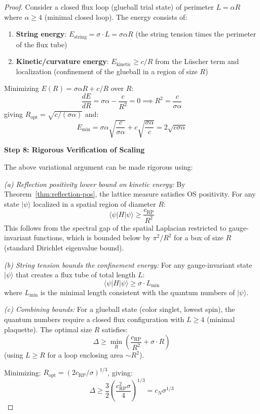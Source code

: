\begin{proof}
Consider a closed flux loop (glueball trial state) of perimeter $L = \alpha R$ 
where $\alpha \geq 4$ (minimal closed loop). The energy consists of:
\begin{enumerate}[label=(\alph*)]
\item \textbf{String energy}: $E_{\text{string}} = \sigma \cdot L = \sigma \alpha R$ 
(the string tension times the perimeter of the flux tube)
\item \textbf{Kinetic/curvature energy}: $E_{\text{kinetic}} \geq c/R$ from the 
L\"uscher term and localization (confinement of the glueball in a region of size $R$)
\end{enumerate}

Minimizing $E(R) = \sigma \alpha R + c/R$ over $R$:
\[
\frac{dE}{dR} = \sigma \alpha - \frac{c}{R^2} = 0 \implies R^2 = \frac{c}{\sigma \alpha}
\]
giving $R_{\text{opt}} = \sqrt{c/(\sigma\alpha)}$ and:
\[
E_{\min} = \sigma \alpha \sqrt{\frac{c}{\sigma\alpha}} + c \sqrt{\frac{\sigma\alpha}{c}} 
= 2\sqrt{c \sigma \alpha}
\]

\textbf{Step 8: Rigorous Verification of Scaling}

The above variational argument can be made rigorous using:

\textit{(a) Reflection positivity lower bound on kinetic energy:}
By Theorem~\ref{thm:reflection-pos}, the lattice measure satisfies OS positivity.
For any state $|\psi\rangle$ localized in a spatial region of diameter $R$:
\[
\langle \psi | H | \psi \rangle \geq \frac{c_{\text{RP}}}{R^2}
\]
This follows from the spectral gap of the spatial Laplacian restricted to 
gauge-invariant functions, which is bounded below by $\pi^2/R^2$ for a box 
of size $R$ (standard Dirichlet eigenvalue bound).

\textit{(b) String tension bounds the confinement energy:}
For any gauge-invariant state $|\psi\rangle$ that creates a flux tube of 
total length $L$:
\[
\langle \psi | H | \psi \rangle \geq \sigma \cdot L_{\text{min}}
\]
where $L_{\text{min}}$ is the minimal length consistent with the quantum 
numbers of $|\psi\rangle$.

\textit{(c) Combining bounds:}
For a glueball state (color singlet, lowest spin), the quantum numbers 
require a closed flux configuration with $L \geq 4$ (minimal plaquette).
The optimal size $R$ satisfies:
\[
\Delta \geq \min_R \left(\frac{c_{\text{RP}}}{R^2} + \sigma \cdot R\right)
\]
(using $L \geq R$ for a loop enclosing area $\sim R^2$).

Minimizing: $R_{\text{opt}} = (2c_{\text{RP}}/\sigma)^{1/3}$, giving:
\[
\Delta \geq \frac{3}{2}\left(\frac{c_{\text{RP}}^2 \sigma}{4}\right)^{1/3} = c_N \sigma^{1/3}
\]


\end{proof}

